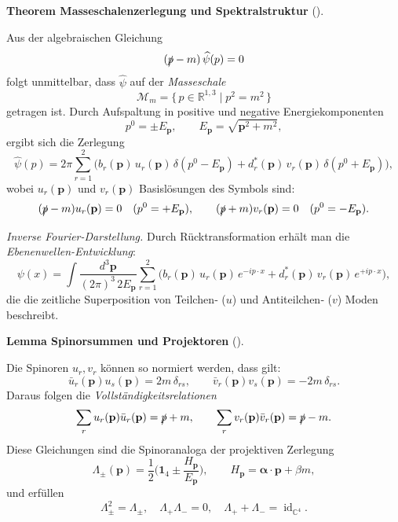 \documentclass[10pt, letterpaper]{article}
\newcommand{\id}{\operatorname{id}}
\newcommand{\R}{\mathbb{R}}
\newcommand{\C}{\mathbb{C}}
\newcommand{\CustomHeading}[3]{%
  \par\medskip\noindent%
  \textbf{#1 #2} \textnormal{(#3)}.\enskip%
}
\newenvironment{THEO}[2]{\begin{unitbox}\CustomHeading{Theorem}{#1}{#2}}{\end{unitbox}}
\newenvironment{LEM}[2]{\begin{unitbox}\CustomHeading{Lemma}{#1}{#2}}{\end{unitbox}}
\begin{document}
\begin{THEO}{Masseschalenzerlegung und Spektralstruktur}{}
Aus der algebraischen Gleichung
\[
(\slashed{p}-m)\,\widehat{\psi}(p)=0
\]
folgt unmittelbar, dass $\widehat{\psi}$ auf der \emph{Masseschale}
\[
\mathcal{M}_m=\{\,p\in\R^{1,3}\mid p^2=m^2\,\}
\]
getragen ist. Durch Aufspaltung in positive und negative Energiekomponenten
\[
p^0=\pm E_{\mathbf{p}},\qquad E_{\mathbf{p}}=\sqrt{\mathbf{p}^2+m^2},
\]
ergibt sich die Zerlegung
\[
\widehat{\psi}(p)
=2\pi\sum_{r=1}^{2}
\Big(
b_r(\mathbf{p})\,u_r(\mathbf{p})\,\delta(p^0-E_{\mathbf{p}})
+d_r^*(\mathbf{p})\,v_r(\mathbf{p})\,\delta(p^0+E_{\mathbf{p}})
\Big),
\]
wobei $u_r(\mathbf{p})$ und $v_r(\mathbf{p})$ Basislösungen des Symbols sind:
\[
(\slashed{p}-m)u_r(\mathbf{p})=0 \quad (p^0=+E_{\mathbf{p}}),\qquad
(\slashed{p}+m)v_r(\mathbf{p})=0 \quad (p^0=-E_{\mathbf{p}}).
\]

\emph{Inverse Fourier-Darstellung.}
Durch Rücktransformation erhält man die \emph{Ebenenwellen-Entwicklung}:
\[
\psi(x)
=\int\!\frac{d^3\mathbf{p}}{(2\pi)^3\,2E_{\mathbf{p}}}\!
\sum_{r=1}^{2}\!\Big(
b_r(\mathbf{p})\,u_r(\mathbf{p})\,e^{-ip\cdot x}
+d_r^*(\mathbf{p})\,v_r(\mathbf{p})\,e^{+ip\cdot x}
\Big),
\]
die die zeitliche Superposition von Teilchen‐ ($u$) und Antiteilchen‐ ($v$) Moden beschreibt.
\end{THEO}




\begin{LEM}{Spinorsummen und Projektoren}{}
Die Spinoren $u_r,v_r$ können so normiert werden, dass gilt:
\[
\bar{u}_r(\mathbf{p})u_s(\mathbf{p})=2m\,\delta_{rs},\qquad
\bar{v}_r(\mathbf{p})v_s(\mathbf{p})=-2m\,\delta_{rs}.
\]
Daraus folgen die \emph{Vollständigkeitsrelationen}
\[
\sum_{r}u_r(\mathbf{p})\bar{u}_r(\mathbf{p})
=\slashed{p}+m,\qquad
\sum_{r}v_r(\mathbf{p})\bar{v}_r(\mathbf{p})
=\slashed{p}-m.
\]
Diese Gleichungen sind die Spinoranaloga der projektiven Zerlegung
\[
\Lambda_\pm(\mathbf{p})
=\frac{1}{2}\Big(\mathbf{1}_4\pm\frac{H_{\mathbf{p}}}{E_{\mathbf{p}}}\Big),
\qquad
H_{\mathbf{p}}=\boldsymbol{\alpha}\!\cdot\!\mathbf{p}+\beta m,
\]
und erfüllen
\[
\Lambda_\pm^2=\Lambda_\pm,\quad
\Lambda_+\Lambda_-=0,\quad
\Lambda_++\Lambda_-=\id_{\C^4}.
\]
\end{LEM}


\end{document}
